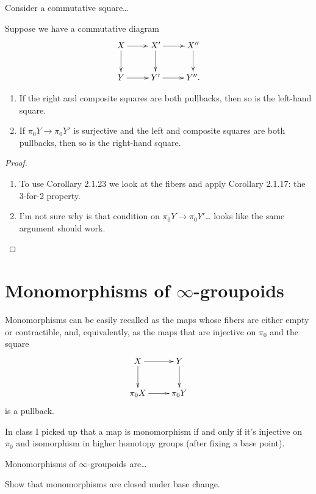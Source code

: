 \begin{exercise}[2.3]
\label{exercise-2.3}
Consider a commutative square…

\end{exercise}

\begin{exercise}[2.4]
\label{exercise-2.4}
Suppose we have a commutative diagram
$$
\xymatrix{
X\ar[r]\ar[d]&X'\ar[d]\ar[r]& X''\ar[d]\\
Y\ar[r]&Y'\ar[r]&Y''.
}
$$
\begin{enumerate}
\item If the right and composite squares are both pullbacks,
then so is the left-hand square.
\item If $\pi_0Y \to \pi_0Y'$ is surjective
and the left and composite squares
are both pullbacks,
then so is the right-hand square.
\end{enumerate}
\end{exercise}

\begin{proof}
\begin{enumerate}
\item To use Corollary 2.1.23 we look at the fibers and apply
 Corollary 2.1.17: the 3-for-2 property.
\item I'm not sure why is that condition on
$\pi_0Y \to \pi_0Y'$… looks like the same argument should work.
\end{enumerate}
\end{proof}

\section{Monomorphisms of $\infty$-groupoids}
\label{section-monomorphisms}

\noindent
Monomorphisms can be easily recalled
as the maps whose fibers are either empty or contractible,
and, equivalently, as the maps that are
injective on $\pi_0$ and the square
$$
\xymatrix{
X\ar[r]\ar[d]&Y\ar[d]\\
\pi_0X\ar[r]&\pi_0Y
}
$$
is a pullback.

In class I picked up that a map is
monomorphism if and only if it's injective on  $\pi_0$ 
and isomorphism in higher homotopy groups
(after fixing a base point).

Monomorphisms of $\infty$-groupoids are…

\begin{exercise}[2.6]
\label{exercise-2.6}
Show that monomorphisms are closed
under base change.
\end{exercise}

